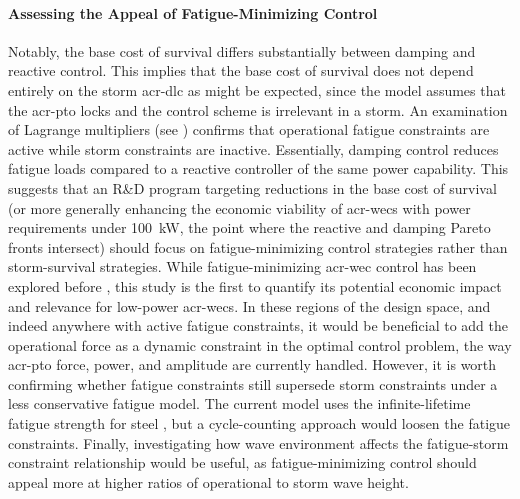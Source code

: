 \paragraph{Assessing the Appeal of Fatigue-Minimizing Control}
Notably, the base cost of survival differs substantially between damping and reactive control.
This implies that the base cost of survival does not depend entirely on the storm \gls{acr-dlc} as might be expected, since the model assumes that the \gls{acr-pto} locks and the control scheme is irrelevant in a storm.
An examination of Lagrange multipliers (see ) confirms that operational fatigue constraints are active while storm constraints are inactive.
Essentially, damping control reduces fatigue loads compared to a reactive controller of the same power capability.
This suggests that an R\&D program targeting reductions in the base cost of survival
 (or more generally enhancing the economic viability of \glspl{acr-wec} with power requirements under 100~kW,
the point where the reactive and damping Pareto fronts intersect)
should focus on fatigue-minimizing control strategies rather than storm-survival strategies.
While fatigue-minimizing \gls{acr-wec} control has been explored before \cite{ferri_balancing_2014}, this study is the first to quantify its potential economic impact and relevance for low-power \glspl{acr-wec}.
In these regions of the design space, and indeed anywhere with active fatigue constraints,
it would be beneficial to add the operational force as a dynamic constraint in the optimal control problem,
the way \gls{acr-pto} force, power, and amplitude are currently handled.
However, it is worth confirming whether fatigue constraints still supersede storm constraints under a less conservative fatigue model.
The current model uses the infinite-lifetime fatigue strength for steel \citep{mccabe_development_2026}, but a cycle-counting approach would loosen the fatigue constraints.
Finally, investigating how wave environment affects the fatigue-storm constraint relationship would be useful,
as fatigue-minimizing control should appeal more at higher ratios of operational to storm wave height.



